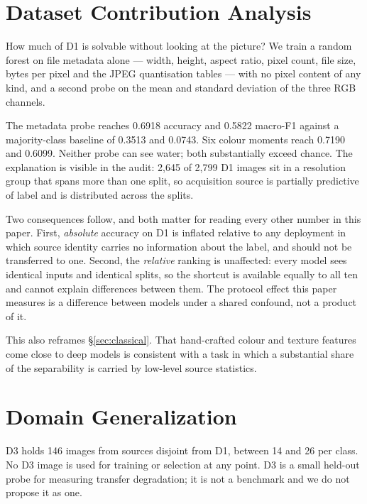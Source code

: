 \documentclass[10pt,journal]{IEEEtran}
\newcommand{\mf}{macro-F1}
\begin{document}
\section{Dataset Contribution Analysis}\label{sec:contribution}
How much of D1 is solvable without looking at the picture? We train a random forest on file
metadata alone --- width, height, aspect ratio, pixel count, file size, bytes per pixel and
the JPEG quantisation tables --- with no pixel content of any kind, and a second probe on the
mean and standard deviation of the three RGB channels.



The metadata probe reaches 0.6918 accuracy and 0.5822 \mf{} against a majority-class baseline
of 0.3513 and 0.0743. Six colour moments reach 0.7190 and 0.6099. Neither probe can see
water; both substantially exceed chance. The explanation is visible in the audit:
2{,}645 of 2{,}799 D1 images sit in a resolution group that spans more than one split, so
acquisition source is partially predictive of label and is distributed across the splits.

Two consequences follow, and both matter for reading every other number in this paper. First,
\emph{absolute} accuracy on D1 is inflated relative to any deployment in which source
identity carries no information about the label, and should not be transferred to one.
Second, the \emph{relative} ranking is unaffected: every model sees identical inputs and
identical splits, so the shortcut is available equally to all ten and cannot explain
differences between them. The protocol effect this paper measures is a difference between
models under a shared confound, not a product of it.

This also reframes \S\ref{sec:classical}. That hand-crafted colour and texture features come
close to deep models is consistent with a task in which a substantial share of the
separability is carried by low-level source statistics.

\section{Domain Generalization}\label{sec:ood}
D3 holds 146 images from sources disjoint from D1, between 14 and 26 per class. No D3 image
is used for training or selection at any point. D3 is a small held-out probe for measuring
transfer degradation; it is not a benchmark and we do not propose it as one.
\end{document}
